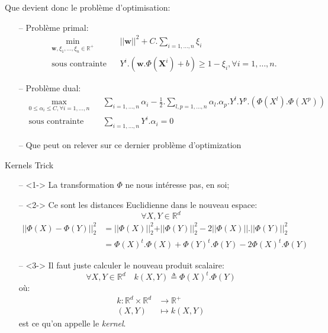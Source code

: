 \documentclass[9pt]{beamer}
\begin{document}
	\begin{frame}{Que devient donc le problème d'optimisation:}
		\begin{itemize}
			\item[--] Problème primal:
			\begin{equation}
				\begin{aligned}
				& \min_{\textbf{w}, \xi_1,\dots,\xi_n \in \mathbb{R}^+}
				& & {\vert\vert \textbf{w} \vert\vert}^2 + C.\sum_{i=1,\dots,n}\xi_i \\
				& \text{sous contrainte}
				& & Y^i.(\textbf{w}.\Phi(\textbf{X}^i) + b) \geq 1 - \xi_i , \forall i = 1, \dots, n.
				\end{aligned}
			\end{equation}
			\item[--] Problème dual:
			\begin{equation}
				\begin{aligned}
				& \max_{0 \leq \alpha_i \leq C ,\forall i=1,\dots,n}
				& & \sum_{i=1,\dots,n} \alpha_i - \frac{1}{2}.\sum_{l,p=1,\dots,n}\alpha_l.\alpha_p.Y^l.Y^p.(\Phi(X^l).\Phi(X^p))\\
				& \text{sous contrainte}
				& & \sum_{i=1,\dots,n}Y^i.\alpha_i=0
				\end{aligned}
			\end{equation}
			\item[--] Que peut on relever sur ce dernier problème d'optimization
		\end{itemize}
	\end{frame}

	\begin{frame}{Kernels Trick}
		\begin{itemize}
			\item[--]<1-> La transformation $\Phi$ ne nous intéresse pas, en soi;
			\item[--]<2-> Ce sont les distances Euclidienne dans le nouveau espace:
			$$\forall X, Y \in \mathbb{R}^d$$
			\begin{align*}
				\vert\vert\Phi(X) - \Phi(Y)\vert\vert_2^2 &= \vert\vert\Phi(X)\vert\vert_2^2 + \vert\vert\Phi(Y)\vert\vert_2^2 - 2 \vert\vert\Phi(X)\vert\vert.\vert\vert\Phi(Y)\vert\vert_2^2 \\
				 &= {\Phi(X)}^t.\Phi(X) + {\Phi(Y)}^t.\Phi(Y) - 2 {\Phi(X)}^t.\Phi(Y)
			\end{align*}
			\item[--]<3-> Il faut juste calculer le nouveau produit scalaire:
			\begin{equation}
				\forall X, Y \in \mathbb{R}^d \quad k(X, Y) \triangleq {\Phi(X)}^t.\Phi(Y)
			\end{equation}
			où:
			\begin{align*}
				k: \mathbb{R}^d \times \mathbb{R}^d &\rightarrow \mathbb{R}^+ \\
				(X, Y) &\mapsto k(X, Y)
			\end{align*}
			est ce qu'on appelle le \textit{kernel}.
		\end{itemize}
	\end{frame}
\end{document}
